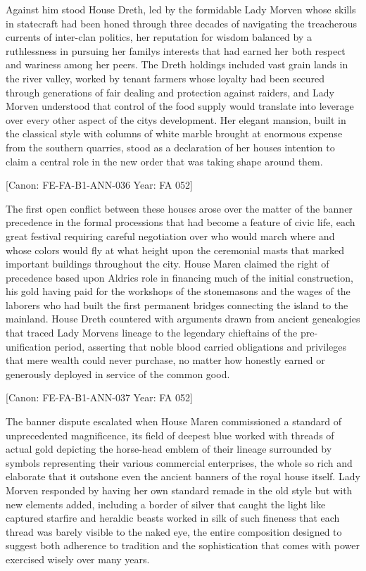 Against him stood House Dreth, led by the formidable Lady Morven whose
skills in statecraft had been honed through three decades of navigating
the treacherous currents of inter-clan politics, her reputation for
wisdom balanced by a ruthlessness in pursuing her
family\textquotesingle s interests that had earned her both respect and
wariness among her peers. The Dreth holdings included vast grain lands
in the river valley, worked by tenant farmers whose loyalty had been
secured through generations of fair dealing and protection against
raiders, and Lady Morven understood that control of the food supply
would translate into leverage over every other aspect of the
city\textquotesingle s development. Her elegant mansion, built in the
classical style with columns of white marble brought at enormous expense
from the southern quarries, stood as a declaration of her
house\textquotesingle s intention to claim a central role in the new
order that was taking shape around them.

{[}Canon: FE-FA-B1-ANN-036 \textbar{} Year: FA 052{]}

The first open conflict between these houses arose over the matter of
the banner precedence in the formal processions that had become a
feature of civic life, each great festival requiring careful negotiation
over who would march where and whose colors would fly at what height
upon the ceremonial masts that marked important buildings throughout the
city. House Maren claimed the right of precedence based upon
Aldric\textquotesingle s role in financing much of the initial
construction, his gold having paid for the workshops of the stonemasons
and the wages of the laborers who had built the first permanent bridges
connecting the island to the mainland. House Dreth countered with
arguments drawn from ancient genealogies that traced Lady
Morven\textquotesingle s lineage to the legendary chieftains of the
pre-unification period, asserting that noble blood carried obligations
and privileges that mere wealth could never purchase, no matter how
honestly earned or generously deployed in service of the common good.

{[}Canon: FE-FA-B1-ANN-037 \textbar{} Year: FA 052{]}

The banner dispute escalated when House Maren commissioned a standard of
unprecedented magnificence, its field of deepest blue worked with
threads of actual gold depicting the horse-head emblem of their lineage
surrounded by symbols representing their various commercial enterprises,
the whole so rich and elaborate that it outshone even the ancient
banners of the royal house itself. Lady Morven responded by having her
own standard remade in the old style but with new elements added,
including a border of silver that caught the light like captured
starfire and heraldic beasts worked in silk of such fineness that each
thread was barely visible to the naked eye, the entire composition
designed to suggest both adherence to tradition and the sophistication
that comes with power exercised wisely over many years.

